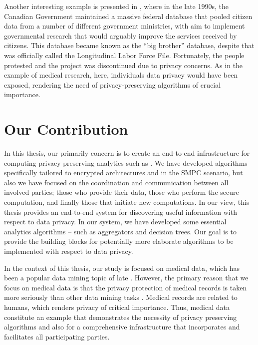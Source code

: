Another interesting example is presented in \cite{lindell2000privacy}, where in the late 1990s, the Canadian Government maintained a massive federal database that pooled citizen data from a number of different government ministries, with aim to implement governmental research that would arguably improve the services received by citizens.
This database became known as the “big brother” database, despite that was officially called the Longitudinal Labor Force File.
Fortunately, the people protested and the project was discontinued due to privacy concerns.
As in the example of medical research, here, individuals data privacy would have been exposed, rendering the need of privacy-preserving algorithms of crucial importance.



\section{Our Contribution}\label{s:our-contribution}
In this thesis, our primarily concern is to create an end-to-end infrastructure for computing privacy preserving analytics such as \cite{lindell2000privacy, agrawal2000privacy}.
We have developed algorithms specifically tailored to encrypted architectures and in the SMPC scenario, but also we have focused on the coordination and communication between all involved parties; those who provide their data, those who perform the secure computation, and finally those that initiate new computations.
In our view, this thesis provides an end-to-end system for discovering useful information with respect to data privacy.
In our system, we have developed some essential analytics algorithms -- such as aggregators and decision trees.
Our goal is to provide the building blocks for potentially more elaborate algorithms to be implemented with respect to data privacy.


In the context of this thesis, our study is focused on medical data, which has been a popular data mining topic of late \cite{chaurasia2017data, erickson2017machine}.
However, the primary reason that we focus on medical data is that the privacy protection of medical records is taken more seriously than other data mining tasks \cite{bertino2005privacy}.
Medical records are related to humans, which renders privacy of critical importance.
Thus, medical data constitute an example that demonstrates the necessity of privacy preserving algorithms and also for a comprehensive infrastructure that incorporates and facilitates all participating parties.


